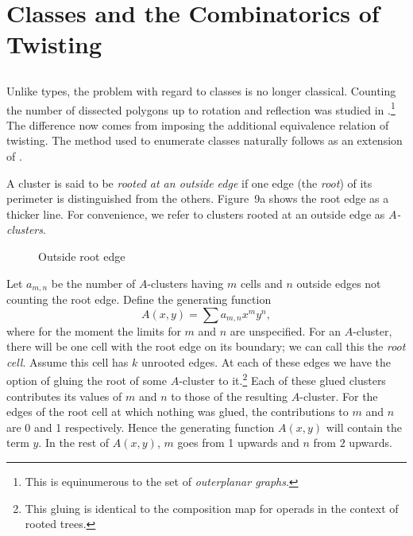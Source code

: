 \documentclass[10pt]{amsart}
\begin{document}
\section {Classes and the Combinatorics of Twisting}

\subsection{} \label{ss:aclusters}
Unlike types, the problem with regard to classes is no longer classical. Counting the number of dissected polygons up to rotation and reflection was studied in \cite{r1}.\footnote{This is equinumerous to the set of {\em outerplanar graphs}.}   The difference now comes from imposing the additional equivalence relation of twisting.  The method used to enumerate classes naturally follows as an extension of \cite{r1}.   

\begin{defn}
A cluster is said to be {\em rooted at an outside edge} if one edge (the {\em root}) of its perimeter is distinguished from the others.  Figure~9a shows the root edge as a thicker line. For convenience, we refer to clusters rooted at an outside edge as {\em $A$-clusters}.
\end{defn}

\begin{figure}[h]
\caption{Outside root edge}
\label{rootedge}
\end{figure}

Let $a_{m,n}$ be the number of $A$-clusters having $m$ cells and $n$ outside edges not counting the root edge.   Define the generating function
\begin{equation}
A(x, y)  =  \sum a_{m,n}x^m y^n,
\label{e:gena}
\end{equation}
where for the moment the limits for $m$ and $n$ are unspecified. For an $A$-cluster, there will be one cell with the root edge on its boundary;  we can call this the {\em root cell}.  Assume this cell has $k$ unrooted edges.  At each of these edges we have the option of gluing the root of some $A$-cluster to it.\footnote{This gluing is identical to the composition map for operads in the context of rooted trees.} Each of these glued clusters contributes its values of $m$ and $n$ to those of the resulting $A$-cluster.  For the edges of the root cell at which nothing was glued, the contributions to $m$ and $n$ are 0 and 1 respectively. Hence the generating function $A(x,y)$ will contain the term $y$.  In the rest of $A(x,y)$, $m$ goes from 1 upwards and $n$ from $2$ upwards.
\end{document}
